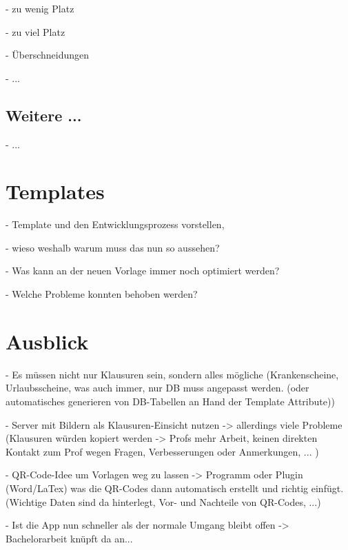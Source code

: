 \documentclass[nomenclature, 150]{HSMW-Thesis}
\begin{document}
		- zu wenig Platz
		
		- zu viel Platz
		
		- Überschneidungen
		
		- ...
		
	\section{Weitere ...}
		- ...




\chapter{Templates}
	- Template und den Entwicklungsprozess vorstellen, 
	
	- wieso weshalb warum muss das nun so aussehen?
	
	- Was kann an der neuen Vorlage immer noch optimiert werden?	
	
	- Welche Probleme konnten behoben werden?
	



		
\chapter{Ausblick}
	- Es müssen nicht nur Klausuren sein, sondern alles mögliche (Krankenscheine, Urlaubsscheine, was auch immer, nur DB muss angepasst werden. (oder automatisches generieren von DB-Tabellen an Hand der Template Attribute))
	
	- Server mit Bildern als Klausuren-Einsicht nutzen -> allerdings viele Probleme (Klausuren würden kopiert werden -> Profs mehr Arbeit, keinen direkten Kontakt zum Prof wegen Fragen, Verbesserungen oder Anmerkungen, ... )
	
	- QR-Code-Idee um Vorlagen weg zu lassen -> Programm oder Plugin (Word/LaTex) was die QR-Codes dann automatisch erstellt und richtig einfügt. (Wichtige Daten sind da hinterlegt, Vor- und Nachteile von QR-Codes, ...)
	
	- Ist die App nun schneller als der normale Umgang bleibt offen -> Bachelorarbeit knüpft da an...
	

\Anhang
\end{document}
